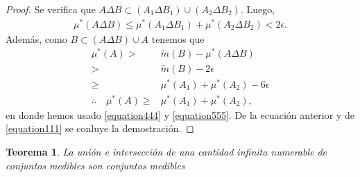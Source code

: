 \documentclass[twoside,12pt,a4 paper,openright]{book}
\newtheorem{teo}[claim]{Teorema}
\begin{document}
\begin{proof}
        
Se verifica  que $A\Delta B \subset (A_1\Delta B_1) \cup (A_2\Delta B_2) $. Luego,  
     \begin{align}\label{equation555}\mu^*(A\Delta B)\leq \mu^*(A_1\Delta B_1) + \mu^*(A_2\Delta B_2)< 2\epsilon.
     \end{align} 
        Adem\'as, como $B \subset (A\Delta B) \cup A $ tenemos que 
    \begin{align*}
        \mu^*(A) >& \tilde{m}(B) - \mu^*(A\Delta B)\\
                 >& \tilde{m}(B) - 2\epsilon \\
                 \geq& \mu^*(A_1) + \mu^*(A_2) - 6\epsilon \\  
                 \therefore \quad \mu^*(A) \geq&\mu^*(A_1) + \mu^*(A_2),
    \end{align*}
en donde hemos usado \eqref{equation444} y \eqref{equation555}. 
 De la ecuaci\'on anterior y de \eqref{equation111}  se conluye la demostraci\'on.
\end{proof}



\begin{teo}
    La uni\'on e intersecci\'on de una cantidad infinita numerable de conjuntos medibles  son conjuntos medibles
\end{teo}
\end{document}
